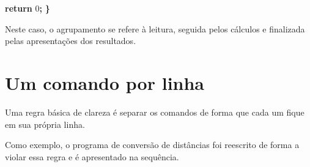 \documentclass[
  11pt,
  a4paper,
]{scrbook}
\newenvironment{Shaded}{\begin{snugshade}}{\end{snugshade}}
\newcommand{\ControlFlowTok}[1]{\textcolor[rgb]{0.13,0.29,0.53}{\textbf{#1}}}
\newcommand{\DecValTok}[1]{\textcolor[rgb]{0.00,0.00,0.81}{#1}}
\newcommand{\OperatorTok}[1]{\textcolor[rgb]{0.81,0.36,0.00}{\textbf{#1}}}
\begin{document}
\begin{Shaded}
\begin{Highlighting}[]
    \ControlFlowTok{return} \DecValTok{0}\OperatorTok{;}
\OperatorTok{\}}
\end{Highlighting}
\end{Shaded}

Neste caso, o agrupamento se refere à leitura, seguida pelos cálculos e
finalizada pelas apresentações dos resultados.

\section{Um comando por linha}\label{um-comando-por-linha}

Uma regra básica de clareza é separar os comandos de forma que cada um
fique em sua própria linha.

Como exemplo, o programa de conversão de distâncias foi reescrito de
forma a violar essa regra e é apresentado na sequência.
\end{document}
